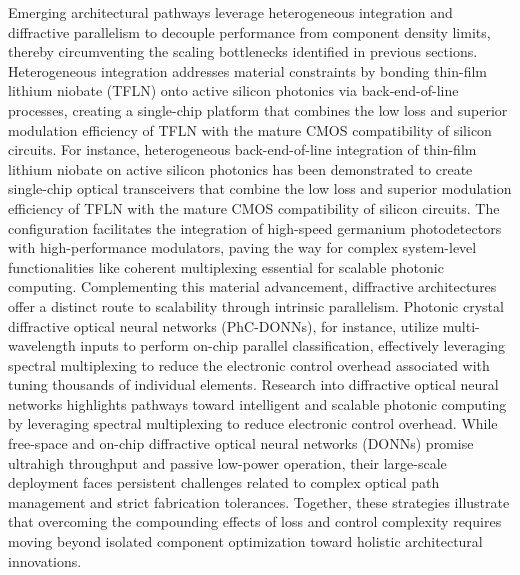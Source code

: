 Emerging architectural pathways leverage heterogeneous integration and diffractive parallelism to decouple performance from component density limits, thereby circumventing the scaling bottlenecks identified in previous sections. Heterogeneous integration addresses material constraints by bonding thin-film lithium niobate (TFLN) onto active silicon photonics via back-end-of-line processes, creating a single-chip platform that combines the low loss and superior modulation efficiency of TFLN with the mature CMOS compatibility of silicon circuits. For instance, heterogeneous back-end-of-line integration of thin-film lithium niobate on active silicon photonics has been demonstrated to create single-chip optical transceivers that combine the low loss and superior modulation efficiency of TFLN with the mature CMOS compatibility of silicon circuits. \citep{s2_9b444e84d20ae6e3d62d2d4df30268b5a53baad2_40af2cc9} The configuration facilitates the integration of high-speed germanium photodetectors with high-performance modulators, paving the way for complex system-level functionalities like coherent multiplexing essential for scalable photonic computing. Complementing this material advancement, diffractive architectures offer a distinct route to scalability through intrinsic parallelism. Photonic crystal diffractive optical neural networks (PhC-DONNs), for instance, utilize multi-wavelength inputs to perform on-chip parallel classification, effectively leveraging spectral multiplexing to reduce the electronic control overhead associated with tuning thousands of individual elements. Research into diffractive optical neural networks highlights pathways toward intelligent and scalable photonic computing by leveraging spectral multiplexing to reduce electronic control overhead. \citep{doi_10_1002_nap2_70098_8d5f2f8a} While free-space and on-chip diffractive optical neural networks (DONNs) promise ultrahigh throughput and passive low-power operation, their large-scale deployment faces persistent challenges related to complex optical path management and strict fabrication tolerances. Together, these strategies illustrate that overcoming the compounding effects of loss and control complexity requires moving beyond isolated component optimization toward holistic architectural innovations. \citep{s2_9b444e84d20ae6e3d62d2d4df30268b5a53baad2_40af2cc9} \citep{doi_10_1515_nanoph_2025_0168_86a0f7aa} \citep{doi_10_1002_nap2_70098_8d5f2f8a}


